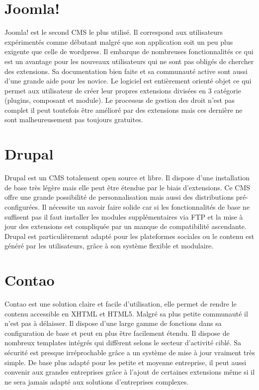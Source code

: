 \documentclass[a4paper,12pt]{report}
\begin{document}
\section{Joomla!}
Joomla! est le second CMS le plus utilisé. Il correspond aux
utilisateurs expérimentés comme débutant malgré que son application
soit un peu plus exigente que celle de wordpress. Il embarque de
nombreuses fonctionnalités ce qui est un avantage pour les nouveaux
utilisateurs qui ne sont pas obligés de chercher des extensions. Sa
documentation bien faite et sa communauté active sont aussi d'une
grande aide pour les novice. Le logiciel est entièrement orienté
objet ce qui permet aux utilisateur de créer leur propres extensions
divisées en 3 catégorie (plugins, composant et module).  Le processus de
gestion des droit n'est pas complet il peut toutefois être amélioré
par des extensions mais ces dernière ne sont malheureusement pas
toujours gratuites.

\section{Drupal}
Drupal est un CMS totalement open source et libre. Il dispose d'une
installation de base très légère mais elle peut être étendue par le
biais d’extensions. Ce CMS offre une grande possibilité de
personnalisation mais aussi des distributions pré-configurées.  Il
nécessite un savoir faire solide car si les fonctionnalités de base ne
suffisent pas il faut installer les modules supplémentaires via FTP et
la mise à jour des extensions est compliquée par un manque de
compatibilité ascendante.  Drupal est particulièrement adapté pour les
plateformes sociales ou le contenu est généré par les utilisateurs,
grâce à son système flexible et modulaire.

\section{Contao}
Contao est une solution claire et facile d'utilisation, elle permet de
rendre le contenu accessible en XHTML et HTML5. Malgré sa plus petite
communauté il n'est pas à délaisser.  Il dispose d'une large gamme de
fonctions dans sa configuration de base et peut en plus être
facilement étendu. Il dispose de nombreux templates intégrés qui
diffèrent selons le secteur d'activité ciblé. Sa sécurité est presque
irréprochable grâce a un système de mise à jour vraiment très
simple. De base plus adapté pour les petite et moyenne entreprise, il
peut aussi convenir aux grandes entreprises grâce à l'ajout de
certaines extensions même si il ne sera jamais adapté aux solutions
d'entreprises complexes.
\end{document}

